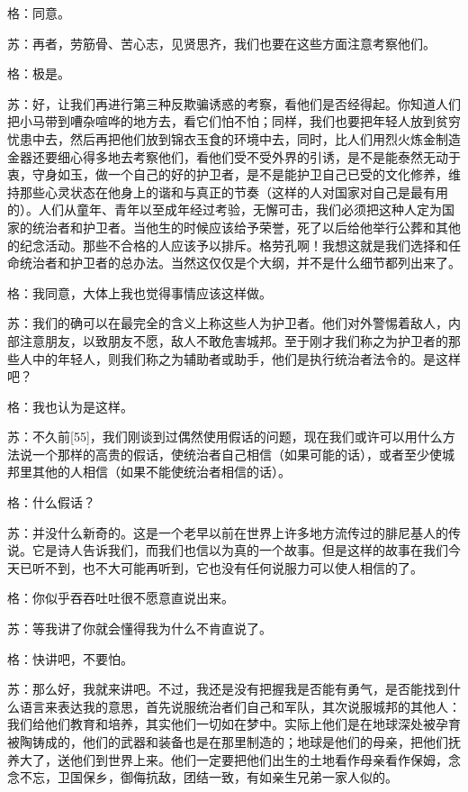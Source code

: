 \documentclass[12pt,oneside]{book}
\begin{document}
格：同意。

苏：再者，劳筋骨、苦心志，见贤思齐，我们也要在这些方面注意考察他们。

格：极是。

苏：好，让我们再进行第三种反欺骗诱惑的考察，看他们是否经得起。你知道人们把小马带到嘈杂喧哗的地方去，看它们怕不怕；同样，我们也要把年轻人放到贫穷忧患中去，然后再把他们放到锦衣玉食的环境中去，同时，比人们用烈火炼金制造金器还要细心得多地去考察他们，看他们受不受外界的引诱，是不是能泰然无动于衷，守身如玉，做一个自己的好的护卫者，是不是能护卫自己已受的文化修养，维持那些心灵状态在他身上的谐和与真正的节奏（这样的人对国家对自己是最有用的）。人们从童年、青年以至成年经过考验，无懈可击，我们必须把这种人定为国家的统治者和护卫者。当他生的时候应该给予荣誉，死了以后给他举行公葬和其他的纪念活动。那些不合格的人应该予以排斥。格劳孔啊！我想这就是我们选择和任命统治者和护卫者的总办法。当然这仅仅是个大纲，并不是什么细节都列出来了。

格：我同意，大体上我也觉得事情应该这样做。

苏：我们的确可以在最完全的含义上称这些人为护卫者。他们对外警惕着敌人，内部注意朋友，以致朋友不愿，敌人不敢危害城邦。至于刚才我们称之为护卫者的那些人中的年轻人，则我们称之为辅助者或助手，他们是执行统治者法令的。是这样吧？

格：我也认为是这样。

苏：不久前[55]，我们刚谈到过偶然使用假话的问题，现在我们或许可以用什么方法说一个那样的高贵的假话，使统治者自己相信（如果可能的话），或者至少使城邦里其他的人相信（如果不能使统治者相信的话）。

格：什么假话？

苏：并没什么新奇的。这是一个老早以前在世界上许多地方流传过的腓尼基人的传说。它是诗人告诉我们，而我们也信以为真的一个故事。但是这样的故事在我们今天已听不到，也不大可能再听到，它也没有任何说服力可以使人相信的了。

格：你似乎吞吞吐吐很不愿意直说出来。

苏：等我讲了你就会懂得我为什么不肯直说了。

格：快讲吧，不要怕。

苏：那么好，我就来讲吧。不过，我还是没有把握我是否能有勇气，是否能找到什么语言来表达我的意思，首先说服统治者们自己和军队，其次说服城邦的其他人：我们给他们教育和培养，其实他们一切如在梦中。实际上他们是在地球深处被孕育被陶铸成的，他们的武器和装备也是在那里制造的；地球是他们的母亲，把他们抚养大了，送他们到世界上来。他们一定要把他们出生的土地看作母亲看作保姆，念念不忘，卫国保乡，御侮抗敌，团结一致，有如亲生兄弟一家人似的。
\end{document}
